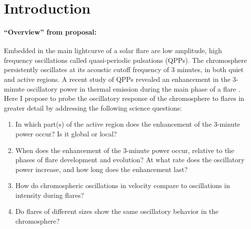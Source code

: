 \section{Introduction}

\paragraph{``Overview'' from proposal:}

Embedded in the main lightcurve of a solar flare are low amplitude, high
frequency oscillations called quasi-periodic pulsations (QPPs). The
chromosphere persistently oscillates at its acoustic cutoff frequency of 3
minutes, in both quiet and active regions. A recent study of QPPs revealed an
enhancement in the 3-minute oscillatory power in thermal emission during the
main phase of a flare \citep{Milligan2017}. Here I propose to probe the
oscillatory response of the chromosphere to flares in greater detail by
addressing the following science questions:
\begin{enumerate}
    \item In which part(s) of the active region does the enhancement of the
        3-minute power occur? Is it global or local?
    \item When does the enhancement of the 3-minute power occur, relative to
        the phases of flare development and evolution? At what rate does the
        oscillatory power increase, and how long does the enhancement last?
    \item How do chromospheric oscillations in velocity compare to oscillations
        in intensity during flares?
    \item Do flares of different sizes show the same oscillatory behavior in
        the chromosphere?
\end{enumerate}

